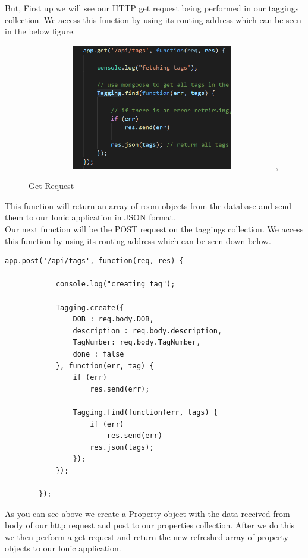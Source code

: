 \documentclass[12pt,a4paper,oneside,openany]{book}
\begin{document}
But, First up we will see our HTTP get request being performed in our taggings collection. We access this function by using its routing address which can be seen in the below figure.

\begin{figure}[ht]
\renewcommand\thefigure{5.4}
\centering
\includegraphics[width=11cm,height=5.5cm]{Images/get.png},
\caption{Get Request}
\label{get}
\end{figure}

This function will return an array of room objects from the database and send them to our Ionic application in JSON format.
\\


Our next function will be the POST request on the taggings collection. We access this function by using its routing address which can be seen down below.\\

\begin{verbatim}
app.post('/api/tags', function(req, res) {

            console.log("creating tag");
    
            Tagging.create({
                DOB : req.body.DOB,
                description : req.body.description,
                TagNumber: req.body.TagNumber,
                done : false
            }, function(err, tag) {
                if (err)
                    res.send(err);
    
                Tagging.find(function(err, tags) {
                    if (err)
                        res.send(err)
                    res.json(tags);
                });
            });
    
        });
\end{verbatim}



As you can see above we create a Property object with the data received from body of our http request and post to our properties collection. After we do this we then perform a get request and return the new refreshed array of property objects to our Ionic application.\\
\end{document}
